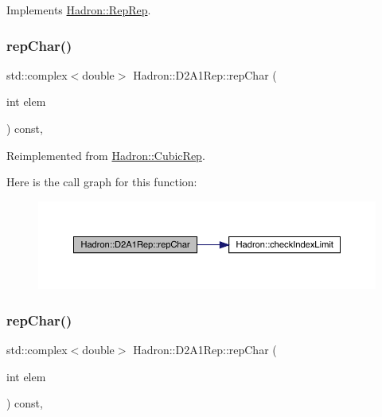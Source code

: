 Implements \mbox{\hyperlink{structHadron_1_1RepRep_ab3213025f6de249f7095892109575fde}{Hadron\+::\+Rep\+Rep}}.

\mbox{\label{structHadron_1_1D2A1Rep_a6c72d27c96ff1d69632ebb7732955c54}} 
\subsubsection{\texorpdfstring{repChar()}{repChar()}\hspace{0.1cm}{\footnotesize\ttfamily [1/3]}}
{\footnotesize\ttfamily std\+::complex$<$double$>$ Hadron\+::\+D2\+A1\+Rep\+::rep\+Char (\begin{DoxyParamCaption}\item[{int}]{elem }\end{DoxyParamCaption}) const\hspace{0.3cm}{\ttfamily [inline]}, {\ttfamily [virtual]}}



Reimplemented from \mbox{\hyperlink{structHadron_1_1CubicRep_af45227106e8e715e84b0af69cd3b36f8}{Hadron\+::\+Cubic\+Rep}}.

Here is the call graph for this function\+:
\nopagebreak
\begin{figure}[H]
\begin{center}
\leavevmode
\includegraphics[width=350pt]{d5/d28/structHadron_1_1D2A1Rep_a6c72d27c96ff1d69632ebb7732955c54_cgraph}
\end{center}
\end{figure}
\mbox{\label{structHadron_1_1D2A1Rep_a6c72d27c96ff1d69632ebb7732955c54}} 
\subsubsection{\texorpdfstring{repChar()}{repChar()}\hspace{0.1cm}{\footnotesize\ttfamily [2/3]}}
{\footnotesize\ttfamily std\+::complex$<$double$>$ Hadron\+::\+D2\+A1\+Rep\+::rep\+Char (\begin{DoxyParamCaption}\item[{int}]{elem }\end{DoxyParamCaption}) const\hspace{0.3cm}{\ttfamily [inline]}, {\ttfamily [virtual]}}



